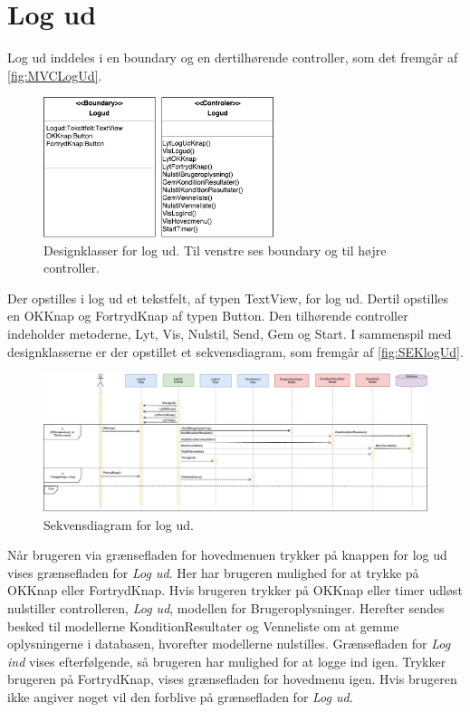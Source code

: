 \section*{Log ud}
Log ud inddeles i en boundary og en dertilhørende controller, som det fremgår af \autoref{fig:MVCLogUd}. 

\begin{figure} [H]
\centering
\includegraphics[width=0.6\textwidth]{figures/MVC/Logud}
\caption{Designklasser for log ud. Til venstre ses boundary og til højre controller.}
\label{fig:MVCLogUd}
\end{figure}

\noindent
Der opstilles i log ud et tekstfelt, af typen TextView, for log ud. Dertil opstilles en OKKnap og FortrydKnap af typen Button. 
Den tilhørende controller indeholder metoderne, Lyt, Vis, Nulstil, Send, Gem og Start. I sammenspil med designklasserne er der opstillet et sekvensdiagram, som fremgår af \autoref{fig:SEKlogUd}.

\begin{figure} [H]
\centering
\includegraphics[width=1.55\textwidth, angle=90]{figures/Sek/SEKLogUd}
\caption{Sekvensdiagram for log ud.}
\label{fig:SEKlogUd}
\end{figure}

\noindent
Når brugeren via grænsefladen for hovedmenuen trykker på knappen for log ud vises grænsefladen for \textit{Log ud}. Her har brugeren mulighed for at trykke på OKKnap eller FortrydKnap. Hvis brugeren trykker på OKKnap eller timer udløst nulstiller controlleren, \textit{Log ud}, modellen for Brugeroplysninger. Herefter sendes besked til modellerne KonditionResultater og Venneliste om at gemme oplysningerne i databasen, hvorefter modellerne nulstilles. Grænsefladen for \textit{Log ind} vises efterfølgende, så brugeren har mulighed for at logge ind igen. Trykker brugeren på FortrydKnap, vises grænsefladen for hovedmenu igen. Hvis brugeren ikke angiver noget vil den forblive på grænsefladen for \textit{Log ud}. 

